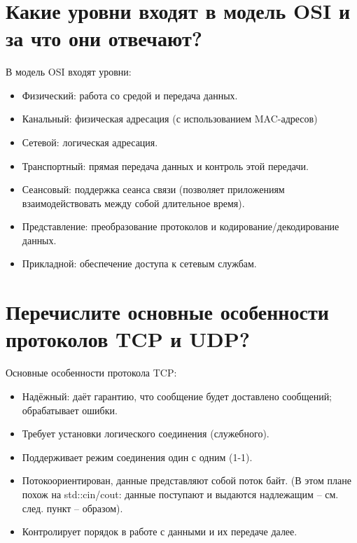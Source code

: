 \documentclass[a4paper,12pt]{article}	%
\title{
	\center{\textbf{CQ 22.}}
	}
\begin{document}

\maketitle


\section{Какие уровни входят в модель OSI и за что они отвечают?}
	
	В модель OSI входят уровни:
	
	\begin{itemize}
	
		\item Физический: работа со средой и
передача данных.
		
		\item Канальный: физическая адресация (с использованием MAC-адресов)
		
		\item Сетевой: логическая адресация.
		
		\item Транспортный: прямая передача данных и контроль этой передачи.
		
		\item Сеансовый: поддержка сеанса связи (позволяет приложениям взаимодействовать между собой длительное время).
		
		\item Представление: преобразование протоколов и кодирование/декодирование данных.
		
		\item Прикладной: обеспечение доступа к сетевым службам.
			
	\end{itemize}
	
	
\section{Перечислите основные особенности протоколов TCP и UDP?}

	Основные особенности протокола TCP:
	
	\begin{itemize}
	
		\item Надёжный: даёт гарантию, что сообщение будет доставлено сообщений; обрабатывает ошибки.
		
		\item Требует установки логического соединения (служебного).
		
		\item Поддерживает режим соединения один с одним (1-1).
		
		\item Потокоориентирован, данные представляют собой поток байт. (В этом плане похож на std::cin/cout: данные поступают и выдаются надлежащим -- см. след. пункт -- образом).
		
		\item Контролирует порядок в работе с данными и их передаче далее.
	
	\end{itemize}
	
\end{document}
